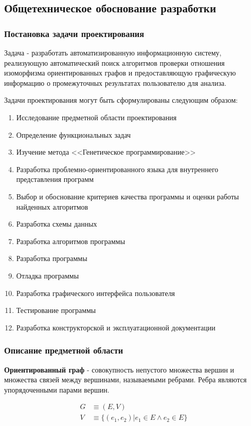 \documentclass[russian,utf8,emptystyle]{eskdtext}
\begin{document}
\subsection{Общетехническое обоснование разработки}
\subsubsection{Постановка задачи проектирования}
Задача - разработать автоматизированную информационную систему, реализующую автоматический поиск алгоритмов проверки отношения изоморфизма ориентированных графов и предоставляющую графическую информацию о промежуточных результатах пользователю для анализа.

Задачи проектирования могут быть сформулированы следующим образом:
\begin{enumerate}
\item Исследование предметной области проектирования
\item Определение функциональных задач
\item Изучение метода <<Генетическое программирование>>
\item Разработка проблемно-ориентированного языка для внутреннего представления программ
\item Выбор и обоснование критериев качества программы и оценки работы найденных алгоритмов
\item Разработка схемы данных
\item Разработка алгоритмов программы
\item Разработка программы
\item Отладка программы
\item Разработка графического интерфейса пользователя
\item Тестирование программы
\item Разработка конструкторской и эксплуатационной документации
\end{enumerate}

\subsubsection{Описание предметной области}
\textbf{Ориентированный граф} - совокупность непустого множества вершин и множества связей между вершинами, называемыми ребрами. Ребра являются упорядоченными парами вершин.

\begin{align*}
G &\equiv ( E, V ) \\ 
V &\equiv \{ (e_1, e_2) | e_1 \in E \wedge e_2 \in E \}
\end{align*}
\end{document}

